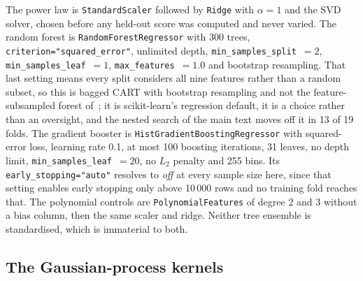 \documentclass[12pt,letterpaper]{article}
\begin{document}
The power law is \texttt{StandardScaler} followed by \texttt{Ridge} with
$\alpha=1$ and the SVD solver, chosen before any held-out score was computed and
never varied. The random forest is \texttt{RandomForestRegressor} with 300 trees,
\texttt{criterion="squared\_error"}, unlimited depth,
\texttt{min\_samples\_split}~$=2$, \texttt{min\_samples\_leaf}~$=1$,
\texttt{max\_features}~$=1.0$ and bootstrap resampling. That last setting means
every split considers all nine features rather than a random subset, so this is
bagged CART with bootstrap resampling and not the feature-subsampled forest
of~\cite{breiman}; it is scikit-learn's regression default, it is a choice
rather than an oversight, and the nested search of the main text moves off it in
13 of 19 folds. The gradient booster is
\texttt{HistGradientBoostingRegressor} with squared-error loss, learning rate
0.1, at most 100 boosting iterations, 31 leaves, no depth limit,
\texttt{min\_samples\_leaf}~$=20$, no $L_2$ penalty and 255 bins. Its
\texttt{early\_stopping="auto"} resolves to \emph{off} at every sample size
here, since that setting enables early stopping only above 10\,000 rows and no
training fold reaches that. The polynomial controls are
\texttt{PolynomialFeatures} of degree 2 and 3 without a bias column, then the
same scaler and ridge. Neither tree ensemble is standardised, which is
immaterial to both.

\subsection{The Gaussian-process kernels}
\end{document}
